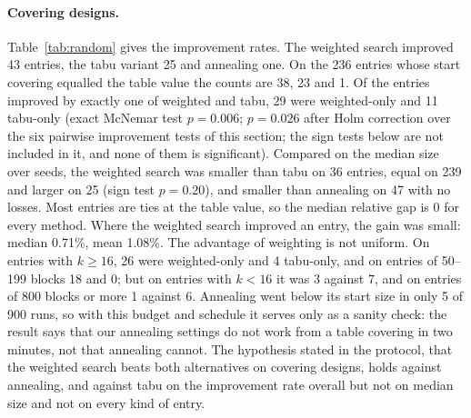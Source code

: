 \documentclass[11pt]{article}
\theoremstyle{remark}
\begin{document}
\paragraph{Covering designs.} Table~\ref{tab:random} gives the improvement rates. The weighted search improved 43
entries, the tabu variant 25 and annealing one. On the 236 entries whose start covering equalled the table value the
counts are 38, 23 and 1. Of the entries improved by exactly one of weighted and tabu, 29 were weighted-only and 11
tabu-only (exact McNemar test $p=0.006$; $p=0.026$ after Holm correction over the six pairwise improvement tests of
this section; the sign tests below are not included in it, and none of them is significant). Compared on the median size over seeds, the weighted search was smaller than tabu on 36 entries, equal
on 239 and larger on 25 (sign test $p=0.20$), and smaller than annealing on 47 with no losses. Most entries are ties at
the table value, so the median relative gap is 0 for every method. Where the weighted search improved an entry, the
gain was small: median 0.71\%, mean 1.08\%. The advantage of weighting is not uniform. On entries with $k\ge 16$, 26
were weighted-only and 4 tabu-only, and on entries of 50--199 blocks 18 and 0; but on entries with $k<16$ it was 3
against 7, and on entries of 800 blocks or more 1 against 6. Annealing went below its start size in only 5 of 900
runs, so with this budget and schedule it serves only as a sanity check: the result says that our annealing settings
do not work from a table covering in two minutes, not that annealing cannot. The hypothesis stated in the protocol, that the
weighted search beats both alternatives on covering designs, holds against annealing, and against tabu on the
improvement rate overall but not on median size and not on every kind of entry.
\end{document}

